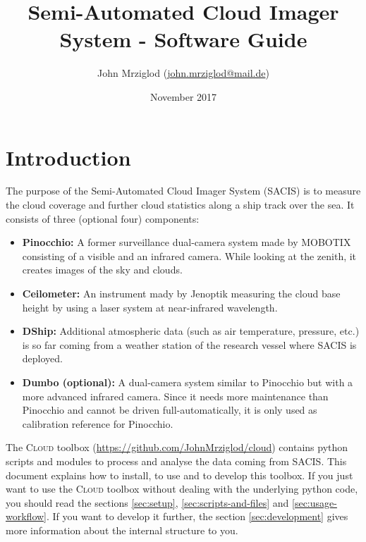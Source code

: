 \documentclass[11pt,a4paper]{article}
\begin{document}
\title{Semi-Automated Cloud Imager System - Software Guide}
\author{John Mrziglod (\href{mailto:john.mrziglod@mail.de}{john.mrziglod@mail.de})}
\date{November 2017}
\maketitle

\newcommand{\cloud}{\textsc{Cloud} }
\newcommand{\config}[2]{\texttt{[#1][#2]}}

\section{Introduction}
The purpose of the Semi-Automated Cloud Imager System (SACIS) is to measure the cloud coverage and further cloud statistics along a ship track over the sea. It consists of three (optional four) components:

\begin{itemize}
	\item \textbf{Pinocchio:} A former surveillance dual-camera system made by MOBOTIX consisting of a visible and an infrared camera. While looking at the zenith, it creates images of the sky and clouds.
	\item \textbf{Ceilometer:} An instrument mady by Jenoptik measuring the cloud base height by using a laser system at near-infrared wavelength.
	\item \textbf{DShip:} Additional atmospheric data (such as air temperature, pressure, etc.) is so far coming from a weather station of the research vessel where SACIS is deployed.
	\item \textbf{Dumbo (optional):} A dual-camera system similar to Pinocchio but with a more advanced infrared camera. Since it needs more maintenance than Pinocchio and cannot be driven full-automatically, it is only used as calibration reference for Pinocchio.
\end{itemize}

The \cloud toolbox (\url{https://github.com/JohnMrziglod/cloud}) contains python scripts and modules to process and analyse the data coming from SACIS. This document explains how to install, to use and to develop this toolbox. If you just want to use the \cloud toolbox without dealing with the underlying python code, you should read the sections \ref{sec:setup}, \ref{sec:scripts-and-files} and \ref{sec:usage-workflow}. If you want to develop it further, the section \ref{sec:development} gives more information about the internal structure to you.
\end{document}
